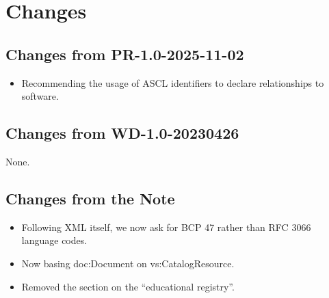 \documentclass{ivoa}
\begin{document}
\section{Changes}

\subsection{Changes from PR-1.0-2025-11-02}

\begin{itemize}
\item Recommending the usage of ASCL identifiers to declare
relationships to software.
\end{itemize}

\subsection{Changes from WD-1.0-20230426}

None.

\subsection{Changes from the Note}

\begin{itemize}
\item Following XML itself, we now ask for BCP 47 rather than RFC
3066 language codes.
\item Now basing doc:Document on vs:CatalogResource.
\item Removed the section on the ``educational registry''.
\end{itemize}


\end{document}
